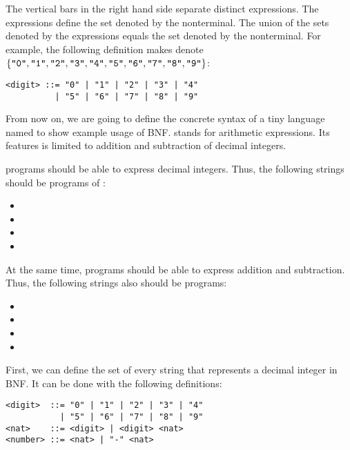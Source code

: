 The vertical bars in the right hand side separate distinct expressions.
The expressions define the set denoted by the nonterminal. The union of the sets
denoted by the expressions equals the set denoted by the nonterminal. For
example, the following definition makes  denote
$\{\texttt{"0"},\texttt{"1"},\texttt{"2"},\texttt{"3"},\texttt{"4"},\texttt{"5"},\texttt{"6"},\texttt{"7"},\texttt{"8"},\texttt{"9"}\}$:

\begin{verbatim}
<digit> ::= "0" | "1" | "2" | "3" | "4"
          | "5" | "6" | "7" | "8" | "9"
\end{verbatim}

From now on, we are going to define the concrete syntax of a tiny language named
\Lang to show example usage of BNF. \Lang stands for arithmetic expressions. Its
features is limited to addition and subtraction of decimal integers.

\Lang programs should be able to express decimal integers. Thus, the
following strings should be programs of \Lang:

\begin{itemize}
  \item {}
  \item {}
  \item {}
  \item {}
\end{itemize}

At the same time, programs should be able to express addition and subtraction.
Thus, the following strings also should be programs:

\begin{itemize}
  \item {}
  \item {}
  \item {}
  \item {}
\end{itemize}

First, we can define the set of every string that represents a decimal integer
in BNF. It can be done with the following definitions:

\begin{verbatim}
<digit>  ::= "0" | "1" | "2" | "3" | "4"
           | "5" | "6" | "7" | "8" | "9"
<nat>    ::= <digit> | <digit> <nat>
<number> ::= <nat> | "-" <nat>
\end{verbatim}

